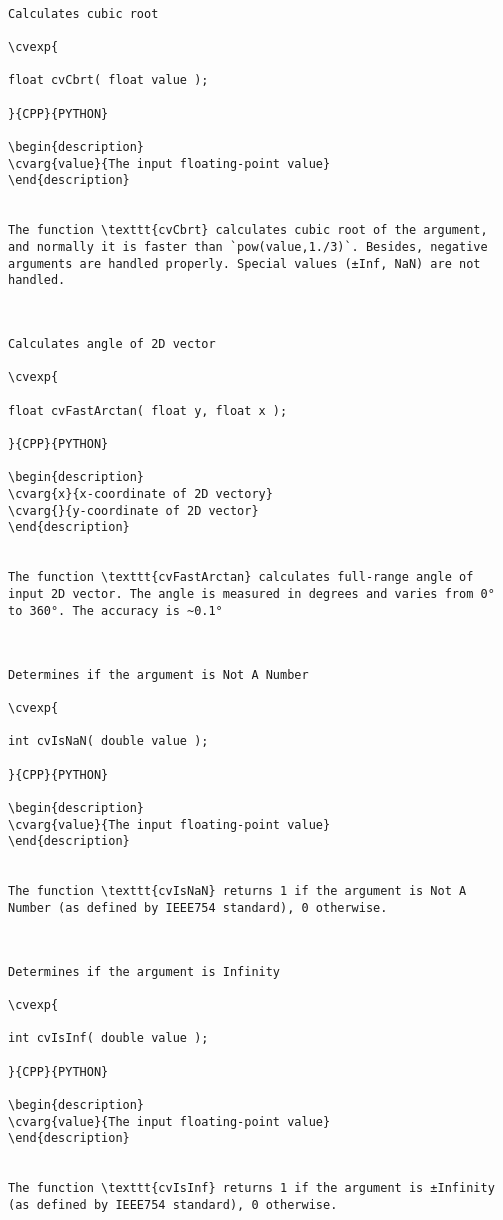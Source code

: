 \begin{verbatim}

Calculates cubic root

\cvexp{

float cvCbrt( float value );

}{CPP}{PYTHON}

\begin{description}
\cvarg{value}{The input floating-point value}
\end{description}


The function \texttt{cvCbrt} calculates cubic root of the argument, and normally it is faster than `pow(value,1./3)`. Besides, negative arguments are handled properly. Special values (±Inf, NaN) are not handled.


\end{verbatim}
\begin{verbatim}

Calculates angle of 2D vector

\cvexp{

float cvFastArctan( float y, float x );

}{CPP}{PYTHON}

\begin{description}
\cvarg{x}{x-coordinate of 2D vectory}
\cvarg{}{y-coordinate of 2D vector}
\end{description}


The function \texttt{cvFastArctan} calculates full-range angle of input 2D vector. The angle is measured in degrees and varies from 0° to 360°. The accuracy is ~0.1°


\end{verbatim}
\begin{verbatim}

Determines if the argument is Not A Number

\cvexp{

int cvIsNaN( double value );

}{CPP}{PYTHON}

\begin{description}
\cvarg{value}{The input floating-point value}
\end{description}


The function \texttt{cvIsNaN} returns 1 if the argument is Not A Number (as defined by IEEE754 standard), 0 otherwise.


\end{verbatim}
\begin{verbatim}

Determines if the argument is Infinity

\cvexp{

int cvIsInf( double value );

}{CPP}{PYTHON}

\begin{description}
\cvarg{value}{The input floating-point value}
\end{description}


The function \texttt{cvIsInf} returns 1 if the argument is ±Infinity (as defined by IEEE754 standard), 0 otherwise.


\end{verbatim}
